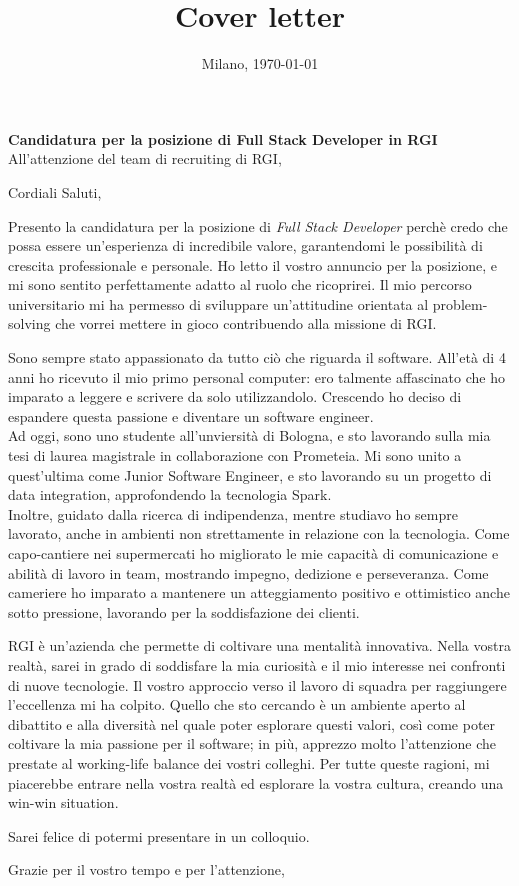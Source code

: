 \documentclass[11pt,a4paper,roman]{moderncv}
\title{Cover letter}
\newcommand{\company}{RGI}
\newcommand{\position}{Full Stack Developer}
\newcommand{\gap}{ }
\begin{document}
    \recipient{\company}{}
    \date{Milano, \today}

    \opening{\textbf{Candidatura per la posizione di \position\gap in \company}
        \\
        \vspace{15pt}
        All'attenzione del team di recruiting di \company,
    }
    \closing{Cordiali Saluti,}

    \makelettertitle

    \justifying
    Presento la candidatura per la posizione di \textit{\position} perchè credo che possa essere un'esperienza di incredibile valore, garantendomi le possibilità di crescita professionale e personale.
    Ho letto il vostro annuncio per la posizione, e mi sono sentito perfettamente adatto al ruolo che ricoprirei.
    Il mio percorso universitario mi ha permesso di sviluppare un'attitudine orientata al problem-solving che vorrei mettere in gioco contribuendo alla missione di \company.

    Sono sempre stato appassionato da tutto ciò che riguarda il software.
    All'età di 4 anni ho ricevuto il mio primo personal computer: ero talmente affascinato che ho imparato a leggere e scrivere da solo utilizzandolo.
    Crescendo ho deciso di espandere questa passione e diventare un software engineer.
    \\
    Ad oggi, sono uno studente all'unviersità di Bologna, e sto lavorando sulla mia tesi di laurea magistrale in collaborazione con Prometeia.
    Mi sono unito a quest'ultima come Junior Software Engineer, e sto lavorando su un progetto di data integration, approfondendo la tecnologia Spark.
    \\
    Inoltre, guidato dalla ricerca di indipendenza, mentre studiavo ho sempre lavorato, anche in ambienti non strettamente in relazione con la tecnologia.
    Come capo-cantiere nei supermercati ho migliorato le mie capacità di comunicazione e abilità di lavoro in team, mostrando impegno, dedizione e perseveranza.
    Come cameriere ho imparato a mantenere un atteggiamento positivo e ottimistico anche sotto pressione, lavorando per la soddisfazione dei clienti.

    \company\gap è un'azienda che permette di coltivare una mentalità innovativa.
    Nella vostra realtà, sarei in grado di soddisfare la mia curiosità e il mio interesse nei confronti di nuove tecnologie.
    Il vostro approccio verso il lavoro di squadra per raggiungere l'eccellenza mi ha colpito.
    Quello che sto cercando è un ambiente aperto al dibattito e alla diversità nel quale poter esplorare questi valori, così come poter coltivare la mia passione per il software;
    in più, apprezzo molto l'attenzione che prestate al working-life balance dei vostri colleghi.
    Per tutte queste ragioni, mi piacerebbe entrare nella vostra realtà ed esplorare la vostra cultura, creando una win-win situation.

    Sarei felice di potermi presentare in un colloquio.

    \vspace{0.5cm}

    Grazie per il vostro tempo e per l'attenzione,

    \makeletterclosing
\end{document}
